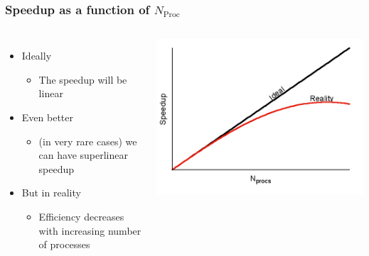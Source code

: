 \documentclass[10pt,t]{beamer}
\begin{document}
\begin{frame}
  \frametitle{Speedup as a function of $N_{\mathrm{Proc}}$}
  \begin{columns}[c]
    \begin{itemize}
    \item Ideally
      \begin{itemize}
      \item The speedup will be linear
      \end{itemize}
    \item Even better
      \begin{itemize}
      \item (in very rare cases) we can have superlinear speedup
      \end{itemize}
    \item But in reality
      \begin{itemize}
      \item Efficiency decreases with increasing number of processes
      \end{itemize}
    \end{itemize}
    \includegraphics[width=\textwidth]{./speedup}
  \end{columns}
\end{frame}
\end{document}

